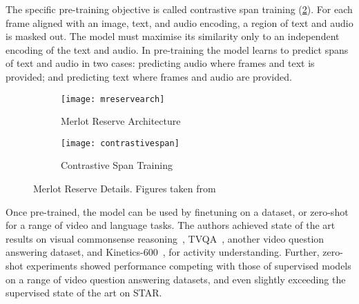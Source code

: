 The specific pre-training objective is called contrastive span training
(\cref{fig:contrastivespan}). For each frame aligned with an image, text,
and audio encoding, a region of text and audio is masked out. The model must
maximise its similarity only to an independent encoding of the text and audio.
In pre-training the model learns to predict spans of text and audio in two
cases: predicting audio where frames and text is provided; and predicting text
where frames and audio are provided. 

\begin{figure}[htpb]
	\centering
	\begin{subfigure}[b]{0.45\textwidth}
		\centering
		\texttt{[image: mreservearch]}
		\caption{Merlot Reserve Architecture}
		\label{fig:mreservearch}
	\end{subfigure}
	\hfill
	\begin{subfigure}[b]{0.45\textwidth}
		\centering
		\texttt{[image: contrastivespan]}
		\caption{Contrastive Span Training}
		\label{fig:contrastivespan}
	\end{subfigure}
	\caption{Merlot Reserve Details. Figures taken from~\citet{zellers2022mreserve}}
	\label{fig:mreserve}
\end{figure}

Once pre-trained, the model can be used by finetuning on a dataset, or
zero-shot for a range of video and language tasks. The authors achieved state
of the art results on visual commonsense reasoning~\citep{zellers2019vcr},
TVQA~\citep{antol2015vqa}, another video question answering dataset, and
Kinetics-600~\citep{carreira2018kinetics600}, for activity understanding.
Further, zero-shot experiments showed performance competing with those of
supervised models on a range of video question answering datasets, and even
slightly exceeding the supervised state of the art on STAR.
